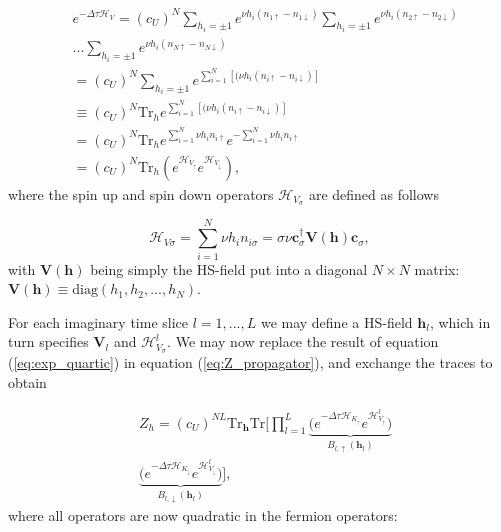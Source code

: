 \documentclass[10pt, twocolumn, twoside]{article}
\begin{document}
\begin{equation}\label{eq:exp_quartic}
\begin{split}
&e^{-\Delta\tau \mathcal{H}_V} =  (c_U)^N \sum_{h_i = \pm 1} e^{\nu h_i ( n_{1\uparrow} - n_{1\downarrow} )} \sum_{h_i = \pm 1} e^{\nu h_i ( n_{2\uparrow} - n_{2\downarrow} )}  \\
&... \sum_{h_i = \pm 1} e^{\nu h_i ( n_{N\uparrow} - n_{N\downarrow} )} \\
&= (c_U)^N \sum_{h_i = \pm 1} e^{\sum_{i=1}^N [(\nu h_i ( n_{i\uparrow} - n_{i\downarrow} ) ]} \\
&\equiv (c_U)^N \text{Tr}_h e^{\sum_{i=1}^N [(\nu h_i ( n_{i\uparrow} - n_{i\downarrow} ) ]} \\
&= (c_U)^N \text{Tr}_h e^{\sum_{i=1}^N \nu h_i n_{i\uparrow}} e^{-\sum_{i=1}^N \nu h_i n_{i\uparrow}} \\
&= (c_U)^N \text{Tr}_h ( e^{\mathcal{H}_{V_\uparrow}} e^{\mathcal{H}_{V_\downarrow}} ) ,
\end{split}
\end{equation}
where the spin up and spin down operators $\mathcal{H}_{V_\sigma}$ are defined as follows

\begin{equation}
\mathcal{H}_{V\sigma} = \sum_{i=1}^N \nu h_i n_{i\sigma} = \sigma \nu \bm c_\sigma^\dagger \bm V(\bm h) \bm c_\sigma,
\end{equation}
with $\bm V(\bm h)$ being simply the HS-field put into a diagonal $N\times N$ matrix: $\bm V(\bm h) \equiv \text{diag}(h_1, h_2, ..., h_N)$.

For each imaginary time slice $l=1,...,L$ we may define a HS-field $\bm h_l$, which in turn specifies $\bm V_l$ and $\mathcal{H}_{V_\sigma}^l$. We may now replace the result of equation (\ref{eq:exp_quartic}) in equation (\ref{eq:Z_propagator}), and exchange the traces to obtain

\begin{equation}\label{eq:Z_quadratic}
\begin{split}
&Z_h = (c_U)^{NL} \text{Tr}_{\bm h} \text{Tr} \bigg[ \prod_{l=1}^L \underbrace{\bigg( e^{-\Delta\tau  \mathcal{H}_{K_\uparrow}} e^{\mathcal{H}_{V_\uparrow}^l} \bigg)}_{B_{l, \uparrow}(\bm h_l)} \\
&\underbrace{\bigg( e^{-\Delta\tau  \mathcal{H}_{K_\downarrow}} e^{\mathcal{H}_{V_\downarrow}^l} \bigg)}_{B_{l, \downarrow}(\bm h_l)} \bigg],
\end{split}
\end{equation}
where all operators are now quadratic in the fermion operators:
\end{document}
